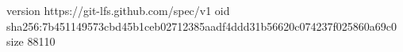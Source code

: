 version https://git-lfs.github.com/spec/v1
oid sha256:7b451149573cbd45b1ceb02712385aadf4ddd31b56620c074237f025860a69c0
size 88110
